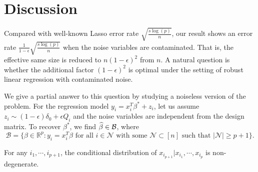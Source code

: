 
\def\ones{{\mathds{1}}}

\section{Discussion}
\label{sec:discuss}


Compared with well-known Lasso error rate \cite{bickel2009simultaneous} $\sqrt{\frac{s\log(p)}{n}}$, our result shows an error rate $\frac{1}{1-\epsilon}\sqrt{\frac{s\log(p)}{n}}$ when the noise variables are contaminated. That is, the effective same size is reduced to $n(1-\epsilon)^2$ from $n$. A natural question is whether the additional factor $(1-\epsilon)^2$ is optimal under the setting of robust linear regression with contaminated noise.

We give a partial answer to this question by studying a noiseless version of the problem. For the regression model $y_i=x_i^T\beta^*+z_i$, let us assume $z_i\sim (1-\epsilon)\delta_0 +\epsilon Q_i$ and the noise variables are independent from the design matrix. To recover $\beta^*$, we find $\widehat{\beta}\in\mathcal{B}$, where
$$\mathcal{B}=\{\beta\in\mathbb{R}^p: y_i=x_i^T\beta\text{ for all }i\in\mathcal{N}\text{ with some }\mathcal{N}\subset[n]\text{ such that }|\mathcal{N}|\geq p+1\}.$$

\begin{condd}
For any $i_1,\cdots,i_{p+1}$, the conditional distribution of $x_{i_{p+1}}|x_{i_1},\cdots,x_{i_{p}}$ is non-degenerate.
\end{condd}

